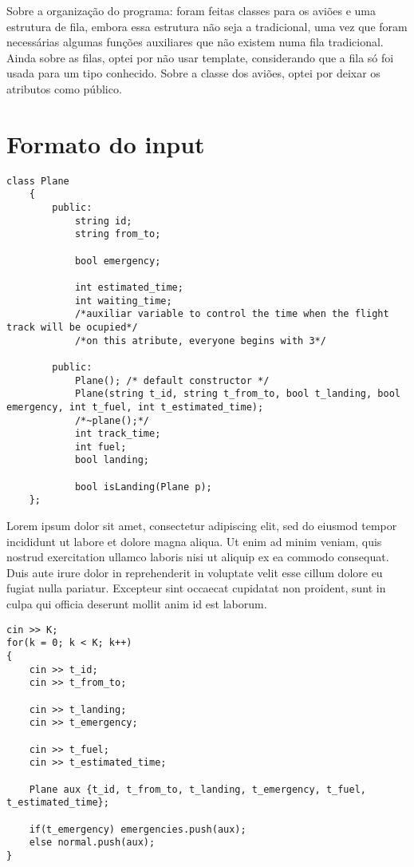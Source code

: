 \documentclass[a4paper,11pt]{article}
\theoremstyle{mytheor}
\begin{document}
Sobre a organização do programa: foram feitas classes para os aviões e uma estrutura de fila, embora essa estrutura não seja a tradicional, uma vez que foram necessárias algumas funções auxiliares que não existem numa fila tradicional. Ainda sobre as filas, optei por não usar template, considerando que a fila só foi usada para um tipo conhecido. Sobre a classe dos aviões, optei por deixar os atributos como público. \newline

\section*{Formato do input}

\begin{lstlisting}[label={list:first},caption= Parte do código em plane.h.]
    class Plane
    {
        public:
            string id;
            string from_to;
    
            bool emergency;
    
            int estimated_time;
            int waiting_time;
            /*auxiliar variable to control the time when the flight track will be ocupied*/
            /*on this atribute, everyone begins with 3*/
    
        public:
            Plane(); /* default constructor */
            Plane(string t_id, string t_from_to, bool t_landing, bool emergency, int t_fuel, int t_estimated_time);
            /*~plane();*/
            int track_time;
            int fuel;
            bool landing;
    
            bool isLanding(Plane p);
    };
\end{lstlisting}

Lorem ipsum dolor sit amet, consectetur adipiscing elit, sed do eiusmod tempor incididunt ut labore et dolore magna aliqua. Ut enim ad minim veniam, quis nostrud exercitation ullamco laboris nisi ut aliquip ex ea commodo consequat. Duis aute irure dolor in reprehenderit in voluptate velit esse cillum dolore eu fugiat nulla pariatur. Excepteur sint occaecat cupidatat non proident, sunt in culpa qui officia deserunt mollit anim id est laborum.



\begin{lstlisting}[label={list:first},caption= Parte do código em airport.cpp que lê os aviões (C++).]
cin >> K;
for(k = 0; k < K; k++)
{
    cin >> t_id;
    cin >> t_from_to;

    cin >> t_landing;
    cin >> t_emergency;

    cin >> t_fuel;
    cin >> t_estimated_time;

    Plane aux {t_id, t_from_to, t_landing, t_emergency, t_fuel, t_estimated_time};
        
    if(t_emergency) emergencies.push(aux);
    else normal.push(aux);
}
\end{lstlisting}
\end{document}
